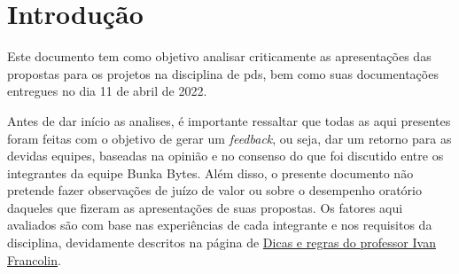 \chapter{Introdução}
Este documento tem como objetivo analisar criticamente as apresentações das propostas para os projetos na disciplina de \acs{pds}, bem como suas documentações entregues no dia 11 de abril de 2022.

Antes de dar início as analises, é importante ressaltar que todas as aqui presentes foram feitas com o objetivo de gerar um \textsl{feedback}, ou seja, dar um retorno para as devidas equipes, baseadas na opinião e no consenso do que foi discutido entre os integrantes da equipe Bunka Bytes. Além disso, o presente documento não pretende fazer observações de juízo de valor ou sobre o desempenho oratório daqueles que fizeram as apresentações de suas propostas. Os fatores aqui avaliados são com base nas experiências de cada integrante e nos requisitos da disciplina, devidamente descritos na página de \href{https://dicas.ivanfm.com/aulas/pds.html}{Dicas e regras do professor Ivan Francolin}.